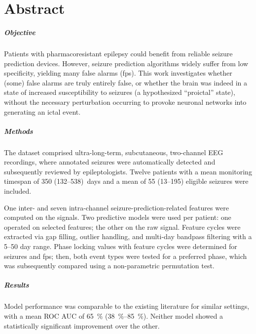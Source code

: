 \chapter*{Abstract}

\begingroup
{}


\paragraph{Objective}
Patients with pharmacoresistant epilepsy could benefit from reliable seizure prediction devices.
However, seizure prediction algorithms widely suffer from low specificity, yielding many false alarms (\glspl{fp}).
This work investigates whether (some) false alarms are truly entirely false, or whether the brain was indeed in a state of increased susceptibility to seizures (a hypothesized \enquote{proictal} state), without the necessary perturbation occurring to provoke neuronal networks into generating an ictal event.


\paragraph{Methods}
The dataset comprised ultra-long-term, subcutaneous, two-channel EEG recordings, where annotated seizures were automatically detected and subsequently reviewed by epileptologists.
Twelve patients with a mean monitoring timespan of \num{350} (\numrange{132}{538})~days and a mean of \num{55} (\numrange{13}{195}) eligible seizures were included.

One inter- and seven intra-channel seizure-prediction-related features were computed on the signals.
Two predictive models were used per patient: one operated on selected features; the other on the raw signal.
Feature cycles were extracted via gap filling, outlier handling, and multi-day bandpass filtering with a \numrange{5}{50} day range.
Phase locking values with feature cycles were determined for seizures and \glspl{fp}; then, both event types were tested for a preferred phase, which was subsequently compared using a non-parametric permutation test.


\paragraph{Results}
Model performance was comparable to the existing literature for similar settings, with a mean ROC AUC of \SI{65}{\percent} (\SIrange{38}{85}{\percent}).
Neither model showed a statistically significant improvement over the other.

